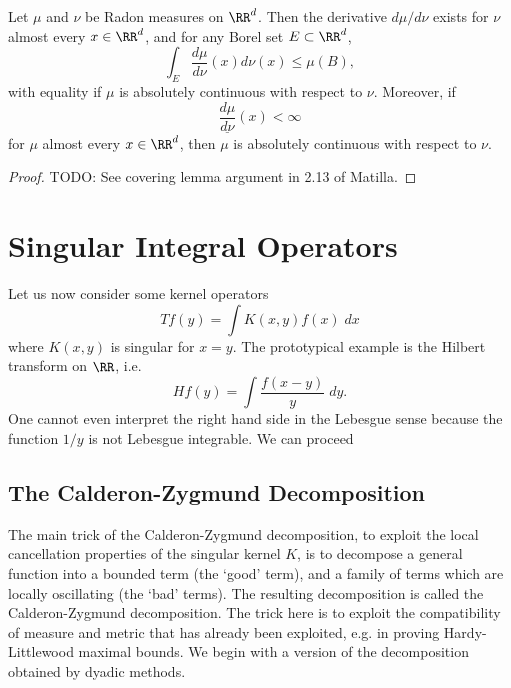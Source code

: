 \begin{theorem}
    Let $\mu$ and $\nu$ be Radon measures on $\RR^d$. Then the derivative $d\mu / d\nu$ exists for $\nu$ almost every $x \in \RR^d$, and for any Borel set $E \subset \RR^d$,
    \[ \int_E \frac{d\mu}{d\nu}(x) d\nu(x) \leq \mu(B), \]
    with equality if $\mu$ is absolutely continuous with respect to $\nu$. Moreover, if
    \[ \underline{\frac{d\mu}{d\nu}}(x) < \infty \]
    for $\mu$ almost every $x \in \RR^d$, then $\mu$ is absolutely continuous with respect to $\nu$.
\end{theorem}
\begin{proof}
    TODO: See covering lemma argument in 2.13 of Matilla.
\end{proof}




\chapter{Singular Integral Operators}

Let us now consider some kernel operators
%
\[ Tf(y) = \int K(x,y) f(x)\; dx \]
%
where $K(x,y)$ is singular for $x = y$. The prototypical example is the Hilbert transform on $\RR$, i.e.
%
\[ Hf(y) = \int \frac{f(x-y)}{y}\; dy. \]
%
One cannot even interpret the right hand side in the Lebesgue sense because the function $1/y$ is not Lebesgue integrable. We can proceed  

\section{The Calderon-Zygmund Decomposition}

The main trick of the Calderon-Zygmund decomposition, to exploit the local cancellation properties of the singular kernel $K$, is to decompose a general function into a bounded term (the `good' term), and a family of terms which are locally oscillating (the `bad' terms). The resulting decomposition is called the Calderon-Zygmund decomposition. The trick here is to exploit the compatibility of measure and metric that has already been exploited, e.g. in proving Hardy-Littlewood maximal bounds. We begin with a version of the decomposition obtained by dyadic methods.

